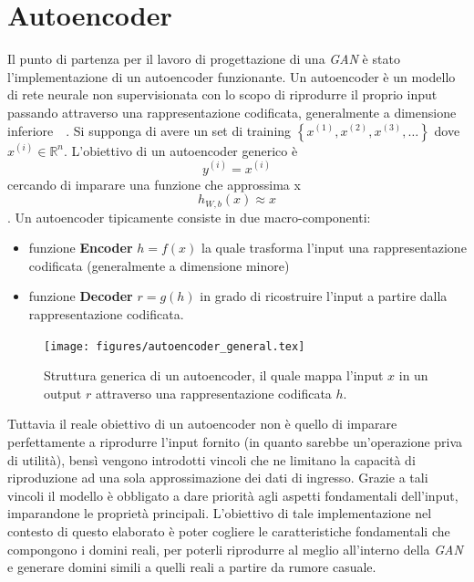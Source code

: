 \newpage
\section{Autoencoder}
\label{autoencoder}
Il punto di partenza per il lavoro di progettazione di una \textit{GAN} è stato l'implementazione di un autoencoder funzionante.  Un autoencoder è un modello di rete neurale non supervisionata con lo scopo di riprodurre il proprio input passando attraverso una rappresentazione codificata, generalmente a dimensione inferiore~\cite{MAL-006}~\cite{Liou:2008:MWP:1411851.1412074}. Si supponga di avere un set di training $\left\{ x^{(1)}, x^{(2)}, x^{(3)}, \ldots \right\}$ dove $x^{(i)} \in \mathbb{R}^n$. L'obiettivo di un autoencoder generico è \[y^{(i)} = x^{(i)}\] cercando di imparare una funzione che approssima x \[h_{W,b}(x) \approx x\]. Un autoencoder tipicamente consiste in due macro-componenti:
\begin{itemize}
\item funzione \textbf{Encoder} $h = f(x)$ la quale trasforma l'input una rappresentazione codificata (generalmente a dimensione minore)
\item funzione \textbf{Decoder} $r = g(h)$ in grado di ricostruire l'input a partire dalla rappresentazione codificata. 
\end{itemize}

\begin{figure}[!bp]
    \centering
	\texttt{[image: figures/autoencoder\_general.tex]}
	\caption{Struttura generica di un autoencoder, il quale mappa l'input $x$ in un output $r$ attraverso una rappresentazione codificata $h$.
\label{fig:autoencodergen}}
\end{figure}

Tuttavia il reale obiettivo di un autoencoder non è quello di imparare perfettamente a riprodurre l'input fornito (in quanto sarebbe un'operazione priva di utilità), bensì vengono introdotti vincoli che ne limitano la capacità di riproduzione ad una sola approssimazione dei dati di ingresso. Grazie a tali vincoli il modello è obbligato a dare priorità agli aspetti fondamentali dell'input, imparandone le proprietà principali. L'obiettivo di tale implementazione nel contesto di questo elaborato è poter cogliere le caratteristiche fondamentali che compongono i domini reali, per poterli riprodurre al meglio all'interno della \textit{GAN} e generare domini simili a quelli reali a partire da rumore casuale.

